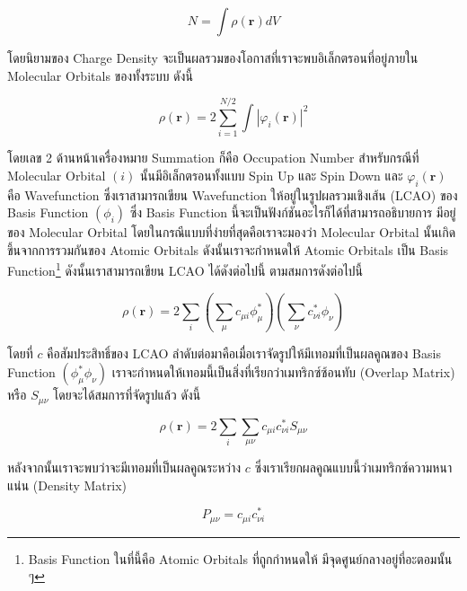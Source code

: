 \begin{equation}
    N = \int \rho(\bm{r}) dV
\end{equation}

โดยนิยามของ Charge Density จะเป็นผลรวมของโอกาสที่เราจะพบอิเล็กตรอนที่อยู่ภายใน Molecular Orbitals ของทั้งระบบ ดังนี้

\begin{equation}\label{eq:charge_density}
    \rho(\bm{r}) = 2 \sum^{N/2}_{i=1} \int |\varphi_{i}(\bm{r})|^{2}
\end{equation}

\noindent โดยเลข 2 ด้านหน้าเครื่องหมาย Summation ก็คือ Occupation Number สำหรับกรณีที่ Molecular Orbital $(i)$
นั้นมีอิเล็กตรอนทั้งแบบ Spin Up และ Spin Down และ $\varphi_{i}(\bm{r})$ คือ Wavefunction ซึ่งเราสามารถเขียน Wavefunction
ให้อยู่ในรูปผลรวมเชิงเส้น (LCAO) ของ Basis Function $(\phi_{i})$ ซึ่ง Basis Function นี้จะเป็นฟังก์ชันอะไรก็ได้ที่สามารถอธิบายการ%
มีอยู่ของ Molecular Orbital โดยในกรณีแบบที่ง่ายที่สุดคือเราจะมองว่า Molecular Orbital นั้นเกิดขึ้นจากการรวมกันของ Atomic Orbitals
ดังนั้นเราจะกำหนดให้ Atomic Orbitals เป็น Basis Function\footnote{Basis Function ในที่นี้คือ Atomic Orbitals ที่ถูกกำหนดให้%
    มีจุดศูนย์กลางอยู่ที่อะตอมนั้น ๆ} ดังนั้นเราสามารถเขียน LCAO ได้ดังต่อไปนี้
ตามสมการดังต่อไปนี้

\begin{equation}
    \rho(\bm{r}) = 2 \sum_{i} \left ( \sum_{\mu} c_{\mu i} \phi_{\mu}^{*} \right )
    \left ( \sum_{\nu} c^{*}_{\nu i}  \phi_{\nu} \right )
\end{equation}

\noindent โดยที่ $c$ คือสัมประสิทธิ์ของ LCAO ลำดับต่อมาคือเมื่อเราจัดรูปให้มีเทอมที่เป็นผลคูณของ Basis Function $(\phi_{\mu}^{*}
    \phi_{\nu})$ เราจะกำหนดให้เทอมนี้เป็นสิ่งที่เรียกว่าเมทริกซ์ซ้อนทับ (Overlap Matrix) หรือ $S_{\mu\nu}$ โดยจะได้สมการที่จัดรูปแล้ว
ดังนี้

\begin{equation}
    \rho(\bm{r}) = 2 \sum_{i}\sum_{\mu\nu} c_{\mu i} c^{*}_{\nu i} S_{\mu\nu}
\end{equation}

หลังจากนั้นเราจะพบว่าจะมีเทอมที่เป็นผลคูณระหว่าง $c$ ซึ่งเราเรียกผลคูณแบบนี้ว่าเมทริกซ์ความหนาแน่น (Density Matrix)

\begin{equation}\label{eq:density_matrix}
    P_{\mu\nu} = c_{\mu i} c^{*}_{\nu i}
\end{equation}


